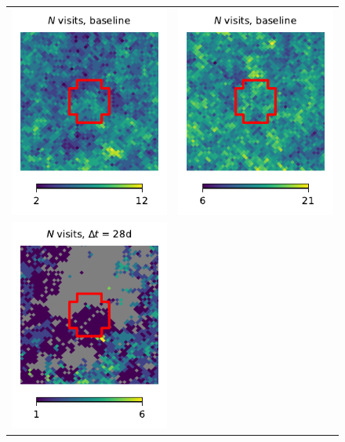 \documentclass[preprintm,linenumbers]{aastex631}
\begin{document}
\begin{figure}
\begin{tabular}{@{}c@{}c@{}}
				\includegraphics{results/skymaps_cutout/skymaps_cutout_first_year_one_snap_v4_0_10yrs_db_noDD_noTwi_nside-256_CountMetric_r_NES_noDD_noTwi.pdf} &
				\includegraphics{results/skymaps_cutout/skymaps_cutout_first_year_one_snap_v4_0_10yrs_db_noDD_noTwi_nside-256_CountMetric_r_WFD_noDD_noTwi.pdf} \\
				\includegraphics{results/skymaps_cutout/skymaps_cutout_first_year_one_snap_v4_0_10yrs_db_noDD_noTwi_tscale-28_nside-256_doAllTemplateMetrics_reduceCount_r_NES_noDD_noTwi.pdf} &

\end{tabular}
\end{figure}
\end{document}
